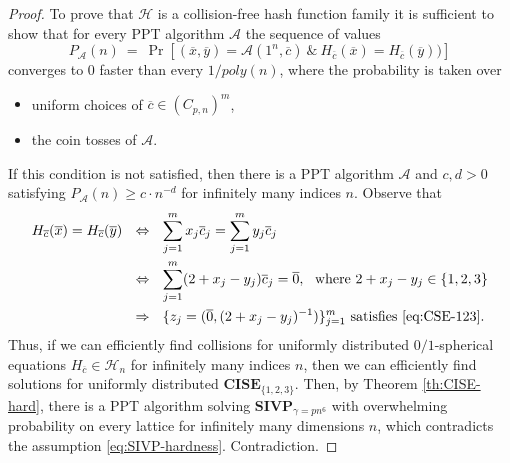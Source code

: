 \documentclass[10pt,a4paper]{amsart}
\def\CA{{\mathcal A}}
\def\CH{{\mathcal H}}
\def\CISE{{\mathbf{CISE}}}
\def\SIVP{{\mathbf{SIVP}}}
\def\ovc{{\overline{c}}}
\def\ovo{{\overline{0}}}
\def\ovx{{\overline{x}}}
\def\ovy{{\overline{y}}}
\begin{document}
\begin{proof}
To prove that $\CH$ is a collision-free hash function family
it is sufficient to show that for every PPT algorithm $\CA$ the sequence of values
$$
P_\CA(n)\ =\ \Pr[(\ovx,\ovy)=\CA(1^n,\ovc)\ \&\ H_\ovc(\ovx)=H_\ovc(\ovy))]
$$
converges to $0$ faster than every $1/poly(n)$,
where the probability is taken over
\begin{itemize}
\item 
uniform choices of $\ovc\in (C_{p,n})^m$,
\item 
the coin tosses of $\CA$.
\end{itemize}
If this condition is not satisfied, then there is a PPT algorithm $\CA$
and $c,d>0$ satisfying $P_\CA(n) \ge c\cdot n^{-d}$ for infinitely many
indices $n$. Observe that
\begin{align*}
H_\ovc(\ovx)=H_\ovc(\ovy)
&\ \ \Leftrightarrow\ \ 
\sum_{j=1}^m x_j \ovc_j = \sum_{j=1}^m y_j \ovc_j\\
&\ \ \Leftrightarrow\ \ 
\sum_{j=1}^m (2+x_j-y_j) \ovc_j = \ovo,
\ \ \mbox{where } 2+x_j-y_j\in\{1,2,3\}
\\
&\ \ \Rightarrow\ \ 
\{z_j=(\ovo,(2+x_j-y_j)^{-1})\}_{j=1}^m
\mbox{ satisfies \eqref{eq:CSE-123}.}
\end{align*}
Thus, if we can efficiently find collisions for uniformly distributed 
$0/1$-spherical equations $H_\ovc\in \CH_n$ for infinitely many
indices $n$, then
we can efficiently find solutions for uniformly 
distributed $\CISE_{\{1,2,3\}}$.
Then, by Theorem \ref{th:CISE-hard}, there is a PPT algorithm 
solving $\SIVP_{\gamma=pn^6}$ with overwhelming probability 
on every lattice for infinitely many dimensions $n$, 
which contradicts the assumption \eqref{eq:SIVP-hardness}. 
Contradiction.
\end{proof}
\end{document}
